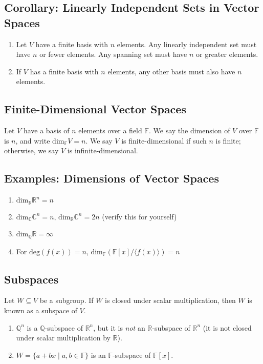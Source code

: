 \documentclass[10pt]{extarticle}
\newcommand{\Q}{\mathbb{Q}}
\newcommand{\R}{\mathbb{R}}
\newcommand{\C}{\mathbb{C}}
\begin{document}
  \subsection{Corollary: Linearly Independent Sets in Vector Spaces}%
  \begin{enumerate}[(1)]
    \item Let $V$ have a finite basis with $n$ elements. Any linearly independent set must have $n$ or fewer elements. Any spanning set must have $n$ or greater elements.
    \item If $V$ has a finite basis with $n$ elements, any other basis must also have $n$ elements.
  \end{enumerate}
  \subsection{Finite-Dimensional Vector Spaces}%
  Let $V$ have a basis of $n$ elements over a field $\mathbb{F}$. We say the dimension of $V$ over $\mathbb{F}$ is $n$, and write $\text{dim}_{\mathbb{F}}V = n$. We say $V$ is finite-dimensional if such $n$ is finite; otherwise, we say $V$ is infinite-dimensional.
  \subsection{Examples: Dimensions of Vector Spaces}%
  \begin{enumerate}[(1)]
    \item $\text{dim}_{\R}\R^{n} = n$
    \item $\text{dim}_{\C}\C^{n} = n$, $\text{dim}_{\R}\C^{n} = 2n$ (verify this for yourself)
    \item $\text{dim}_{\Q}\R = \infty$
    \item For $\text{deg}(f(x)) = n$, $\text{dim}_{\mathbb{F}}(\mathbb{F}[x]/\langle f(x) \rangle) = n$
  \end{enumerate}
  \subsection{Subspaces}%
  Let $W\subseteq V$ be a subgroup. If $W$ is closed under scalar multiplication, then $W$ is known as a subspace of $V$.
  \begin{enumerate}[(1)]
    \item $\Q^{n}$ is a $\Q$-subspace of $\R^n$, but it is \textit{not} an $\R$-subspace of $\R^n$ (it is not closed under scalar multiplication by $\R$).
    \item $W = \{a+bx\mid a,b\in\mathbb{F}\}$ is an $\mathbb{F}$-subspace of $\mathbb{F}[x]$.
  \end{enumerate}
\end{document}
